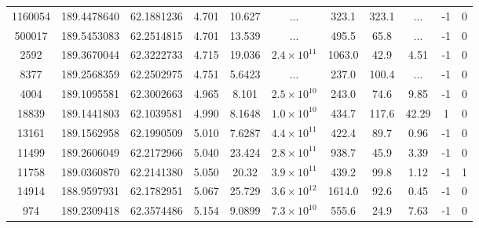 \begin{table}
\begin{tabular}{ccccccccccc}
    1160054 &                  189.4478640 &                 62.1881236 &          4.701 &           10.627 &                ... &          323.1 &       323.1 &         ... &               -1 &                  0 \\
     500017 &                  189.5453083 &                 62.2514815 &          4.701 &           13.539 &                ... &          495.5 &        65.8 &         ... &               -1 &                  0 \\
       2592 &                  189.3670044 &                 62.3222733 &          4.715 &           19.036 & $2.4\times10^{11}$ &         1063.0 &        42.9 &        4.51 &               -1 &                  0 \\
       8377 &                  189.2568359 &                 62.2502975 &          4.751 &           5.6423 &                ... &          237.0 &       100.4 &         ... &               -1 &                  0 \\
       4004 &                  189.1095581 &                 62.3002663 &          4.965 &            8.101 & $2.5\times10^{10}$ &          243.0 &        74.6 &        9.85 &               -1 &                  0 \\
      18839 &                  189.1441803 &                 62.1039581 &          4.990 &           8.1648 & $1.0\times10^{10}$ &          434.7 &       117.6 &       42.29 &                1 &                  0 \\
      13161 &                  189.1562958 &                 62.1990509 &          5.010 &           7.6287 & $4.4\times10^{11}$ &          422.4 &        89.7 &        0.96 &               -1 &                  0 \\
      11499 &                  189.2606049 &                 62.2172966 &          5.040 &           23.424 & $2.8\times10^{11}$ &          938.7 &        45.9 &        3.39 &               -1 &                  0 \\
      11758 &                  189.0360870 &                 62.2141380 &          5.050 &            20.32 & $3.9\times10^{11}$ &          439.2 &        99.8 &        1.12 &               -1 &                  1 \\
      14914 &                  188.9597931 &                 62.1782951 &          5.067 &           25.729 & $3.6\times10^{12}$ &         1614.0 &        92.6 &        0.45 &               -1 &                  0 \\
        974 &                  189.2309418 &                 62.3574486 &          5.154 &           9.0899 & $7.3\times10^{10}$ &          555.6 &        24.9 &        7.63 &               -1 &                  0 \\

\end{tabular}
\end{table}
